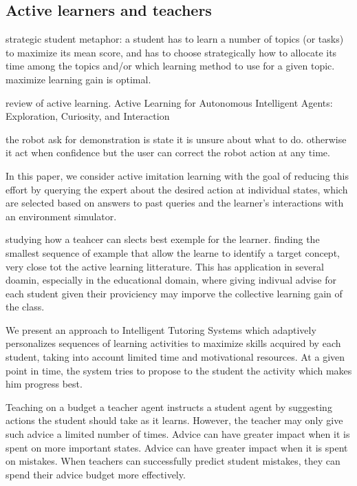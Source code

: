 \subsection{Active learners and teachers}

\cite{lopes2012strategic} strategic student metaphor: a student has to learn a number of topics (or tasks) to maximize its mean score, and has to choose strategically how to allocate its time among the topics and/or which learning method to use for a given topic. maximize learning gain is optimal. 

\cite{lopes2014active} review of active learning. Active Learning for Autonomous Intelligent Agents: Exploration, Curiosity, and Interaction

\cite{chernova09jair} the robot ask for demonstration is state it is unsure about what to do. otherwise it act when confidence but the user can correct the robot action at any time.

\cite{judah2012active} In this paper, we
consider active imitation learning with the
goal of reducing this effort by querying the
expert about the desired action at individual
states, which are selected based on answers
to past queries and the learner's interactions
with an environment simulator. 


\cite{cakmak2012algorithmic} studying how a teahcer can slects best exemple for the learner. finding the smallest sequence of example that allow the learne to identify a target concept, very close tot the active learning litterature. This has application in several doamin, especially in the educational domain, where giving indivual advise for each student given their proviciency may imporve the collective learning gain of the class. 

\cite{clement2014online} We present an approach to Intelligent Tutoring Systems which adaptively personalizes sequences of learning activities to maximize skills acquired by each student, taking into account limited time and motivational resources. At a given point in time, the system tries to propose to the student the activity which makes him progress best.

\cite{torrey2013teaching} Teaching on a budget
a teacher agent instructs a student agent by suggesting actions the student should take as it learns. However, the teacher may only give such advice a limited number of times.  Advice can have greater impact when it is spent on more
important states. Advice can have greater impact when it is spent on mistakes. When teachers can successfully predict student mistakes, they
can spend their advice budget more effectively.

